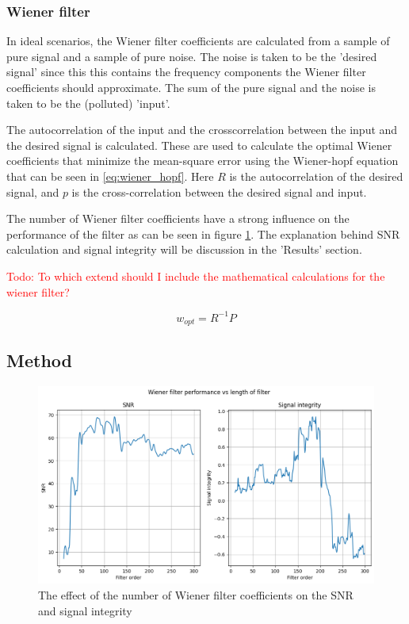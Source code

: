 \subsubsection{Wiener filter}
In ideal scenarios, the Wiener filter coefficients are calculated from a sample of pure signal and a sample of pure noise. The noise is taken to be the 'desired signal' since this this contains the frequency components the Wiener filter coefficients should approximate. The sum of the pure signal and the noise is taken to be the (polluted) 'input'.

The autocorrelation of the input and the crosscorrelation between the input and the desired signal is calculated. These are used to calculate the optimal Wiener coefficients that minimize the mean-square error using the Wiener-hopf equation that can be seen in \ref{eq:wiener_hopf}. Here $R$ is the autocorrelation of the desired signal, and $p$ is the cross-correlation between the desired signal and input. 

The number of Wiener filter coefficients have a strong influence on the performance of the filter as can be seen in figure \ref{fig:wiener_filter_length}. The explanation behind SNR calculation and signal integrity will be discussion in the 'Results' section.

\textcolor{red}{Todo: To which extend should I include the mathematical calculations for the wiener filter?}

\begin{equation}
    w_{opt} = R^{-1}P
    \label{eq:wiener_hopf}
\end{equation}

\subsection{Method}
\begin{figure}[h!t]
	\begin{center}
		\includegraphics[width=1.0\columnwidth]{images/wiener_filter_length.png}
	\end{center}
	\caption{The effect of the number of Wiener filter coefficients on the SNR and signal integrity}
	\label{fig:wiener_filter_length}
\end{figure}


